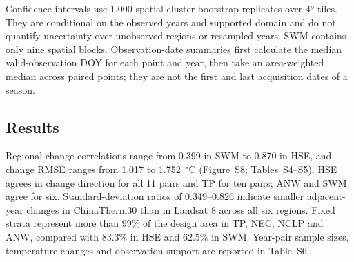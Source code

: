 Confidence intervals use 1,000 spatial-cluster bootstrap replicates over 4° tiles. They are conditional on the observed years and supported domain and do not quantify uncertainty over unobserved regions or resampled years. SWM contains only nine spatial blocks. Observation-date summaries first calculate the median valid-observation DOY for each point and year, then take an area-weighted median across paired points; they are not the first and last acquisition dates of a season.

\subsection*{Results}

Regional change correlations range from 0.399 in SWM to 0.870 in HSE, and change RMSE ranges from 1.017 to 1.752~$^{\circ}$C (Figure~S8; Tables~S4--S5). HSE agrees in change direction for all 11 pairs and TP for ten pairs; ANW and SWM agree for six. Standard-deviation ratios of 0.349--0.826 indicate smaller adjacent-year changes in ChinaTherm30 than in Landsat 8 across all six regions. Fixed strata represent more than 99\% of the design area in TP, NEC, NCLP and ANW, compared with 83.3\% in HSE and 62.5\% in SWM. Year-pair sample sizes, temperature changes and observation support are reported in Table~S6.


